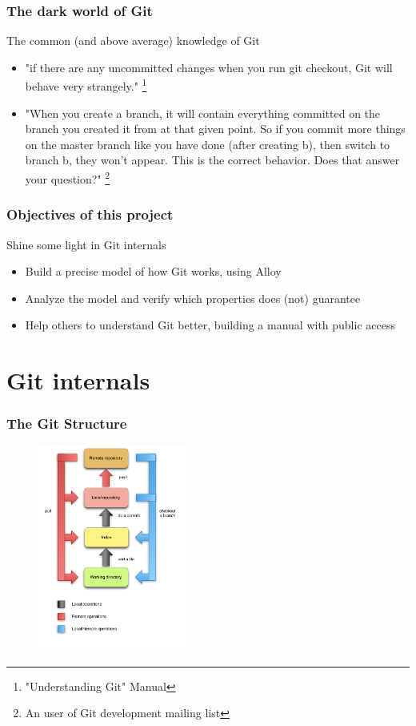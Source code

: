 \documentclass{beamer}
\begin{document}
\begin{frame}
	\frametitle{The dark world of Git}
	\begin{block}{The common (and above average) knowledge of Git }
	\begin{itemize}
	\item "if there are any uncommitted changes when you run git checkout,
	 Git will behave very strangely." \footnote{"Understanding Git" Manual}
	\item "When you create a branch, it will contain everything
         committed on the branch you created it from at that given
         point. So if you commit more things on the master branch like
         you have done (after creating b), then switch to branch b,
         they won't appear. This is the correct behavior. Does that
         answer your question?" \footnote{An user of Git development 
	 mailing list} 
	\end{itemize}
	\end{block}
\end{frame}

\begin{frame}
	\frametitle{Objectives of this project}
	\begin{block}{Shine some light in Git internals}
		\begin{itemize}
			\item Build a precise model of how Git works, using 
			Alloy
			\item Analyze the model and verify which properties
			does (not) guarantee
			\item Help others to understand Git better, building
			a manual with public access
		\end{itemize}
	\end{block}
\end{frame}


\section{Git internals}

\begin{frame}
   \frametitle{The Git Structure}
   \begin{figure}
      \centering
      \includegraphics[width=0.45\textwidth]{images/git_workflow.png}
   \end{figure}
\end{frame}
\end{document}
